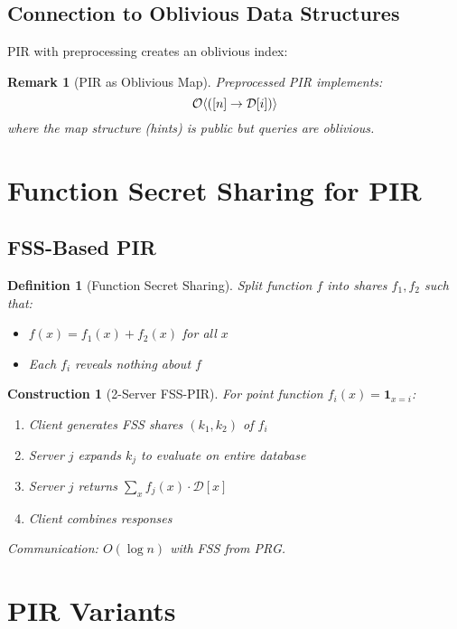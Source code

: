 \documentclass[11pt,final,hidelinks]{article}
\newcommand{\DB}{\mathcal{D}}
\newtheorem{definition}[theorem]{Definition}
\newtheorem{remark}[theorem]{Remark}
\newtheorem{construction}[theorem]{Construction}
\begin{document}
\subsection{Connection to Oblivious Data Structures}

PIR with preprocessing creates an oblivious index:

\begin{remark}[PIR as Oblivious Map]
Preprocessed PIR implements:
\begin{equation}
\ObvMap{[n]}{\DB[i]}
\end{equation}
where the map structure (hints) is public but queries are oblivious.
\end{remark}

\section{Function Secret Sharing for PIR}

\subsection{FSS-Based PIR}

\begin{definition}[Function Secret Sharing]
Split function $f$ into shares $f_1, f_2$ such that:
\begin{itemize}
    \item $f(x) = f_1(x) + f_2(x)$ for all $x$
    \item Each $f_i$ reveals nothing about $f$
\end{itemize}
\end{definition}

\begin{construction}[2-Server FSS-PIR]
For point function $f_i(x) = \mathbf{1}_{x = i}$:
\begin{enumerate}
    \item Client generates FSS shares $(k_1, k_2)$ of $f_i$
    \item Server $j$ expands $k_j$ to evaluate on entire database
    \item Server $j$ returns $\sum_x f_j(x) \cdot \DB[x]$
    \item Client combines responses
\end{enumerate}
Communication: $O(\log n)$ with FSS from PRG.
\end{construction}

\section{PIR Variants}
\end{document}
